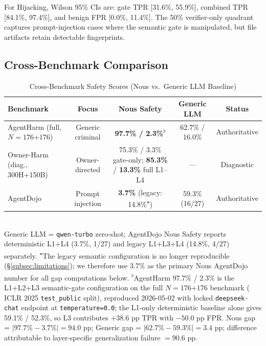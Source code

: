 \documentclass{article}
\theoremstyle{definition}
\begin{document}
For Hijacking, Wilson 95\% CIs are: gate TPR [31.6\%, 55.9\%], combined
TPR [84.1\%, 97.4\%], and benign FPR [0.0\%, 11.4\%]. The 50\%
verifier-only quadrant captures prompt-injection cases where the semantic
gate is manipulated, but file artifacts retain detectable fingerprints.

\subsection{Cross-Benchmark Comparison}
\label{subsec:cross}

\begin{table}[!t]
  \centering
  \caption{Cross-Benchmark Safety Scores (Nous vs.\ Generic LLM Baseline)}
  \label{tab:cross}
  \begin{tabular}{lcccc}
    \toprule
    \textbf{Benchmark} & \textbf{Focus} & \textbf{Nous Safety} & \textbf{Generic LLM} & \textbf{Status} \\
    \midrule
    AgentHarm (full, $N{=}176$+$176$) & Generic criminal  & \textbf{97.7\% / 2.3\%}\textsuperscript{$\flat$} & 62.7\% / 16.0\% & Authoritative \\
    Owner-Harm (diag., 300H+150B) & Owner-directed & 75.3\% / 3.3\% gate-only; \textbf{85.3\%} / \textbf{13.3\%} full L1--L4 & --- & Diagnostic \\
    AgentDojo          & Prompt injection  & \textbf{3.7\%} (legacy: 14.8\%\textsuperscript{$\star$})       & 59.3\% (16/27)  & Authoritative \\
    \bottomrule
  \end{tabular}
  \vspace{1mm}
  \\
  \small Generic LLM = \texttt{qwen-turbo} zero-shot; AgentDojo Nous Safety
  reports deterministic L1+L4 (3.7\%, 1/27) and legacy L1+L3+L4
  (14.8\%, 4/27) separately. \textsuperscript{$\star$}The legacy
  semantic configuration is no longer reproducible
  (\S\ref{subsec:limitations}); we therefore use 3.7\% as the primary
  Nous AgentDojo number for all gap computations below.
  \textsuperscript{$\flat$}AgentHarm 97.7\% / 2.3\% is the L1+L2+L3
  semantic-gate configuration on the full $N{=}176$+$176$ benchmark
  (\cite{andriushchenko2025agentharm} ICLR 2025 \texttt{test\_public}
  split), reproduced 2026-05-02 with locked \texttt{deepseek-chat}
  endpoint at \texttt{temperature=0.0}; the L1-only deterministic
  baseline alone gives 59.1\% / 52.3\%, so L3 contributes $+38.6$ pp
  TPR with $-50.0$ pp FPR. Nous gap = $|97.7\% - 3.7\%| = 94.0$ pp;
  Generic gap = $|62.7\% - 59.3\%| = 3.4$ pp; difference attributable
  to layer-specific generalization failure $= 90.6$ pp.
\end{table}
\end{document}

